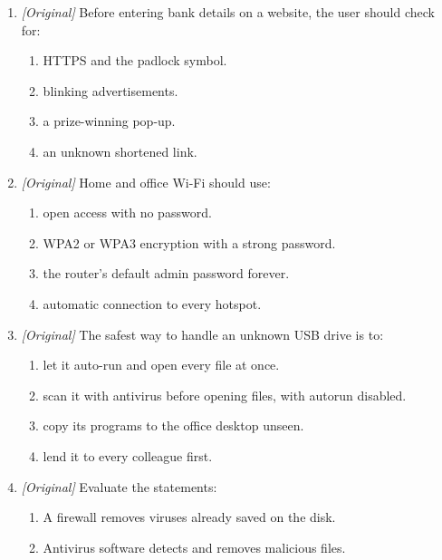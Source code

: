 \begin{enumerate}[label=\textbf{Q\arabic*.}, leftmargin=*]
\begin{enumerate}[label=\Alph*.]
    \item regular and kept offline or off-site, with restores tested.
    \item stored only on the same disk as the original.
    \item made once and never checked again.
    \item shared with strangers for safety.
  \end{enumerate}
\item \textit{[Original]} Before entering bank details on a website, the user
  should check for:
  \begin{enumerate}[label=\Alph*.]
    \item HTTPS and the padlock symbol.
    \item blinking advertisements.
    \item a prize-winning pop-up.
    \item an unknown shortened link.
  \end{enumerate}
\item \textit{[Original]} Home and office Wi-Fi should use:
  \begin{enumerate}[label=\Alph*.]
    \item open access with no password.
    \item WPA2 or WPA3 encryption with a strong password.
    \item the router's default admin password forever.
    \item automatic connection to every hotspot.
  \end{enumerate}
\item \textit{[Original]} The safest way to handle an unknown USB drive is to:
  \begin{enumerate}[label=\Alph*.]
    \item let it auto-run and open every file at once.
    \item scan it with antivirus before opening files, with autorun disabled.
    \item copy its programs to the office desktop unseen.
    \item lend it to every colleague first.
  \end{enumerate}
\item \textit{[Original]} Evaluate the statements:
  \begin{enumerate}[label=\Roman*.]
    \item A firewall removes viruses already saved on the disk.
    \item Antivirus software detects and removes malicious files.

\end{enumerate}
\end{enumerate}
